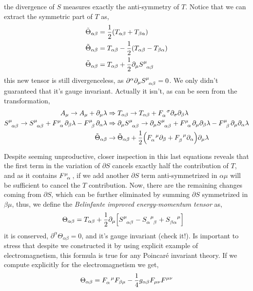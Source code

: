 the divergence of $S$ measures exactly the anti-symmetry of $T$. Notice that we can extract the symmetric part of $T$ as,
\begin{align}
    {\tilde\Theta}_{\alpha\beta}&= \frac12\qty(T_{\alpha\beta}+T_{\beta\alpha})\\
    {\tilde\Theta}_{\alpha\beta}&= T_{\alpha\beta} - \frac12\qty(T_{\alpha\beta}-T_{\beta\alpha})\\
    {\tilde\Theta}_{\alpha\beta}&= T_{\alpha\beta} + \frac12\partial_\mu \tensor{S}{^\mu_\alpha_\beta}
\end{align}
this new tensor is still divergenceless, as $\partial^\alpha\partial_\mu \tensor{S}{^\mu_\alpha_\beta}=0$. We only didn't guaranteed that it's 
gauge invariant. Actually it isn't, as can be seen from the transformation,
\begin{align}
    A_\mu\rightarrow A_\mu +\partial_\mu \lambda&\Rightarrow T_{\alpha\beta}\rightarrow T_{\alpha\beta} +\tensor{F}{_\alpha^\sigma}\partial_\sigma\partial_\beta\lambda\\
    \tensor{S}{^\mu_\alpha_\beta}\rightarrow \tensor{S}{^\mu_\alpha_\beta}+\tensor{F}{^\mu_\alpha}\partial_\beta \lambda-\tensor{F}{^\mu_\beta}\partial_\alpha \lambda&\Rightarrow 
    \partial_\mu\tensor{S}{^\mu_\alpha_\beta}\rightarrow \partial_\mu\tensor{S}{^\mu_\alpha_\beta}+\tensor{F}{^\mu_\alpha}\partial_\mu\partial_\beta \lambda-\tensor{F}{^\mu_\beta}\partial_\mu\partial_\alpha \lambda\\
    {\tilde\Theta}_{\alpha\beta}&\rightarrow {\tilde\Theta}_{\alpha\beta}+\frac12\qty(\tensor{F}{_\alpha^\mu}\partial_\beta+\tensor{F}{_\beta^\mu}\partial_\alpha )\partial_\mu\lambda
\end{align}

Despite seeming unproductive, closer inspection in this last equations reveals that the first term in 
the variation of $\partial S$ cancels exactly half the contribution of $T$, and as it contains $\tensor{F}{^\mu_\alpha}$, if we add 
another $\partial S$ term anti-symmetrized in $\alpha\mu$ will be sufficient to cancel the $T$ 
contribution. Now, there are the remaining changes coming from $\partial S$, which can be further 
eliminated by summing $\partial S$ symmetrized in $\beta\mu$, thus, we define the \textit{Belinfante improved energy-momentum tensor} as,
\begin{align}
    {\Theta}_{\alpha\beta}&= T_{\alpha\beta} + \frac12\partial_\mu \qty[\tensor{S}{^\mu_\alpha_\beta}-\tensor{S}{_\alpha^\mu_\beta}+\tensor{S}{_\beta_\alpha^\mu}]
\end{align}
it is conserved, $\partial^\alpha \Theta_{\alpha\beta}=0$, and it's gauge invariant (check it!). Is important to stress that 
despite we constructed it by using explicit example of electromagnetism, this formula is true for any Poincaré invariant theory. If we 
compute explicitly for the electromagnetism we get,
\begin{align}
    \Theta_{\alpha\beta} = \tensor{F}{_\alpha^\mu}F_{\beta\mu}-\frac14g_{\alpha\beta}F_{\mu\nu}F^{\mu\nu}
\end{align}


